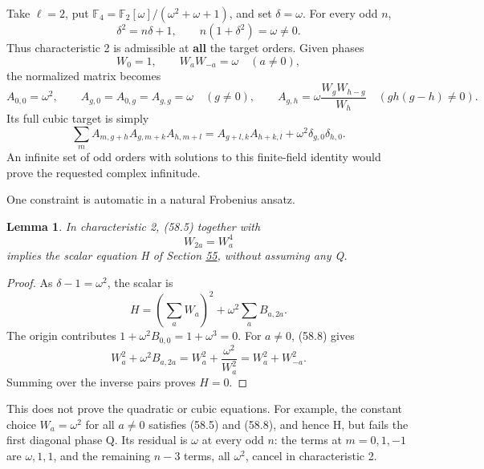 \documentclass[11pt,reqno]{amsart}
\theoremstyle{plain}
\newtheorem{lemma}[theorem]{Lemma}
\begin{document}
Take \(\ell=2\), put
\(\mathbb F_4=\mathbb F_2[\omega]/(\omega^2+\omega+1)\), and set
\(\delta=\omega\). For every odd \(n\),
\begin{equation*}
 \delta^2=n\delta+1,\qquad n(1+\delta^2)=\omega\ne0.
 \tag{58.4}
\end{equation*}
Thus characteristic 2 is admissible at \textbf{all} the target orders.
Given phases
\begin{equation*}
 W_0=1,\qquad W_aW_{-a}=\omega\quad(a\ne0),
 \tag{58.5}
\end{equation*}
the normalized matrix becomes
\begin{equation*}
 A_{0,0}=\omega^2,\qquad
 A_{g,0}=A_{0,g}=A_{g,g}=\omega\quad(g\ne0),\qquad
 A_{g,h}=\omega\frac{W_gW_{h-g}}{W_h}
 \quad(gh(g-h)\ne0).
 \tag{58.6}
\end{equation*}
Its full cubic target is simply
\begin{equation*}
 \boxed{\sum_m A_{m,g+h}A_{g,m+k}A_{h,m+l}
       =A_{g+l,k}A_{h+k,l}+\omega^2\delta_{g,0}\delta_{h,0}.}
 \tag{58.7}
\end{equation*}
An infinite set of odd orders with solutions to this finite-field
identity would prove the requested complex infinitude.

One constraint is automatic in a natural Frobenius ansatz.

\begin{lemma}
In characteristic 2, (58.5) together with
\begin{equation*}
 W_{2a}=W_a^4
 \tag{58.8}
\end{equation*}
implies the scalar equation H of Section \hyperref[sec:55]{55}, without assuming any Q.
\end{lemma}

\begin{proof}
As \(\delta-1=\omega^2\), the scalar is
\[
 H=\left(\sum_a W_a\right)^2+\omega^2\sum_a B_{a,2a}.
\]
The origin contributes \(1+\omega^2B_{0,0}=1+\omega^3=0\).
For \(a\ne0\), (58.8) gives
\[
 W_a^2+\omega^2B_{a,2a}
 =W_a^2+\frac{\omega^2}{W_a^2}
 =W_a^2+W_{-a}^2.
\]
Summing over the inverse pairs proves \(H=0\).
\end{proof}

This does not prove the quadratic or cubic equations. For example,
the constant choice \(W_a=\omega^2\) for all \(a\ne0\) satisfies
(58.5) and (58.8), and hence H, but fails the first diagonal phase Q.
Its residual is \(\omega\) at every odd \(n\): the terms at
\(m=0,1,-1\) are \(\omega,1,1\), and the remaining \(n-3\)
terms, all \(\omega^2\), cancel in characteristic 2.
\end{document}
